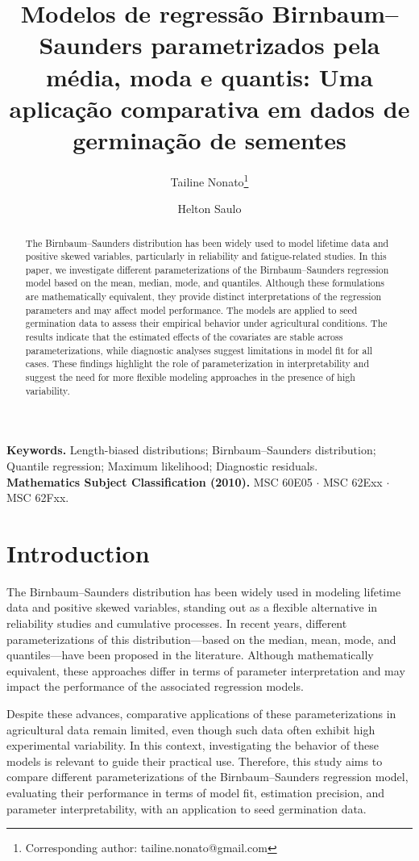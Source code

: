 \documentclass[12pt]{article}%
\title{\bf Modelos de regressão Birnbaum--Saunders parametrizados pela média, moda e quantis: Uma aplicação comparativa em dados de germinação de sementes}
\author[1]{Tailine Nonato\thanks{Corresponding author: tailine.nonato@gmail.com}}
\author[1,2]{Helton Saulo}
\affil[1]{Department of Statistics, University of
	 Bras\'ilia, Bras\'ilia, Brazil}
\affil[2]{
Department of Economics, Federal University of Pelotas, Pelotas, Brazil}
\numberwithin{equation}{section} %
\begin{document}
\maketitle

\begin{abstract}
The Birnbaum–Saunders distribution has been widely used to model lifetime data and positive skewed variables, particularly in reliability and fatigue-related studies. In this paper, we investigate different parameterizations of the Birnbaum–Saunders regression model based on the mean, median, mode, and quantiles. Although these formulations are mathematically equivalent, they provide distinct interpretations of the regression parameters and may affect model performance. The models are applied to seed germination data to assess their empirical behavior under agricultural conditions. The results indicate that the estimated effects of the covariates are stable across parameterizations, while diagnostic analyses suggest limitations in model fit for all cases. These findings highlight the role of parameterization in interpretability and suggest the need for more flexible modeling approaches in the presence of high variability.
\end{abstract}

\smallskip
\noindent
{\small {\bfseries Keywords.} {Length-biased distributions; Birnbaum--Saunders distribution; Quantile regression;
Maximum likelihood; Diagnostic residuals. }}
\\
{\small{\bfseries Mathematics Subject Classification (2010).} {MSC 60E05 $\cdot$ MSC 62Exx $\cdot$ MSC 62Fxx.}}



\section{Introduction}
\noindent

The Birnbaum–Saunders distribution has been widely used in modeling lifetime data and positive skewed variables, standing out as a flexible alternative in reliability studies and cumulative processes. In recent years, different parameterizations of this distribution—based on the median, mean, mode, and quantiles—have been proposed in the literature. Although mathematically equivalent, these approaches differ in terms of parameter interpretation and may impact the performance of the associated regression models.

Despite these advances, comparative applications of these parameterizations in agricultural data remain limited, even though such data often exhibit high experimental variability. In this context, investigating the behavior of these models is relevant to guide their practical use. Therefore, this study aims to compare different parameterizations of the Birnbaum–Saunders regression model, evaluating their performance in terms of model fit, estimation precision, and parameter interpretability, with an application to seed germination data.
\end{document}
